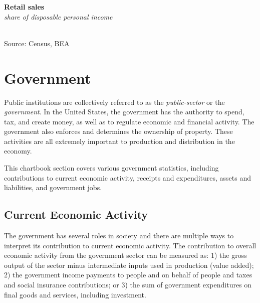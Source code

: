 \documentclass{report}
\newcommand{\tbllink}[1]{\href{https://raw.githubusercontent.com/bdecon/US-chartbook/master/chartbook/data/#1}{\faTable}}
\newcommand{\barylab}[2]{yticklabel style={text width=#1, align=right, 
		style={black!70}, text height=#2},}
\newcommand{\bbar}[2]{extra #1 ticks = {{#2}}, extra #1 tick labels = ,
		extra #1 tick style = {grid=major, grid style={thick, black!25}},}
\newcommand{\barplotnogrid}{xbar=0pt, axis line style={draw=none},
	    yticklabel style={align=left, anchor=east},
      		xmajorticks=false, ymajorgrids=false,   
	    ytick=data, tickwidth=0pt, area legend, reverse legend,
	    nodes near coords, nodes near coords align={horizontal},}
\begin{document}
{\begin{minipage}{0.56\textwidth}
\normalsize \textbf{Retail sales}\\
\footnotesize{\textit{share of disposable personal income}}\\
\hspace*{-2mm} \\
\footnotesize{Source: Census, BEA} \hfill \tbllink{rs_comp.csv}
\end{minipage}
\newpage
\begin{minipage}{0.76\textwidth}
\section*{\color{darkgray}\LARGE Government}
\label{sec:gov}
\small Public institutions are collectively referred to as the \textit{public-sector} or the \textit{government}. In the United States, the government has the authority to spend, tax, and create money, as well as to regulate economic and financial activity. The government also enforces and determines the ownership of property. These activities are all extremely important to production and distribution in the economy.

This chartbook section covers various government statistics, including contributions to current economic activity, receipts and expenditures, assets and liabilities, and government jobs.
\subsection*{\color{black!70} \seriffont Current Economic Activity}
\small The government has several roles in society and there are multiple ways to interpret its contribution to current economic activity. The contribution to overall economic activity from the government sector can be measured as: 1) the gross output of the sector minus intermediate inputs used in production (value added); 2) the government income payments to people and on behalf of people and taxes and social insurance contributions; or 3) the sum of government expenditures on final goods and services, including investment. 


\end{minipage}}
\end{document}
